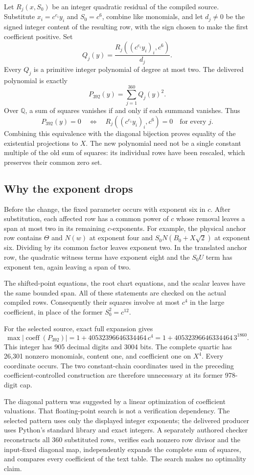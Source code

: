 Let $R_j(x,S_0)$ be an integer quadratic residual of the compiled source.
Substitute $x_i=c^{e_i}y_i$ and $S_0=c^6$, combine like monomials, and
let $d_j\ne0$ be the signed integer content of the resulting row, with
the sign chosen to make the first coefficient positive. Set
\[
 Q_j(y)=\frac{R_j((c^{e_i}y_i)_i,c^6)}{d_j}.
\]
Every $Q_j$ is a primitive integer polynomial of degree at most two.
The delivered polynomial is exactly
\[
 P_{392}(y)=\sum_{j=1}^{360}Q_j(y)^2.
\]
Over $\mathbb Q$, a sum of squares vanishes if and only if each
summand vanishes. Thus
\[
 P_{392}(y)=0\quad\Longleftrightarrow\quad
 R_j((c^{e_i}y_i)_i,c^6)=0\quad\text{for every }j.
\]
Combining this equivalence with the diagonal bijection proves equality
of the existential projections to $X$. The new polynomial need not be
a single constant multiple of the old sum of squares: its individual
rows have been rescaled, which preserves their common zero set.

\subsection{Why the exponent drops}

Before the change, the fixed parameter occurs with exponent six in $c$.
After substitution, each affected row has a common power of $c$ whose
removal leaves a span at most two in its remaining $c$-exponents.
For example, the physical anchor row contains $\Theta$ and $N(w)$
at exponent four and $S_0N(B_0+X\sqrt2)$ at exponent six. Dividing
by its common factor leaves exponent two. In the translated anchor
row, the quadratic witness terms have exponent eight and the
$S_0U$ term has exponent ten, again leaving a span of two.

The shifted-point equations, the root chart equations, and the scalar
leaves have the same bounded span. All of these statements are checked
on the actual compiled rows. Consequently their squares involve at
most $c^4$ in the large coefficient, in place of the former $S_0^2=c^{12}$.

For the selected source, exact full expansion gives
\[
 \max|\operatorname{coeff}(P_{392})|
 =1+40532396646334464\,c^4
 =1+40532396646334464\,3^{1860}.
\]
This integer has 905 decimal digits and 3004 bits. The complete
quartic has 26,301 nonzero monomials, content one, and coefficient
one on $X^4$. Every coordinate occurs. The two constant-chain
coordinates used in the preceding coefficient-controlled construction
are therefore unnecessary at its former 978-digit cap.

The diagonal pattern was suggested by a linear optimization of
coefficient valuations. That floating-point search is not a verification
dependency. The selected pattern uses only the displayed integer
exponents; the delivered producer uses Python's standard library and
exact integers. A separately authored checker reconstructs all 360
substituted rows, verifies each nonzero row divisor and the input-fixed
diagonal map, independently expands the complete sum of squares,
and compares every coefficient of the text table. The search makes
no optimality claim.
